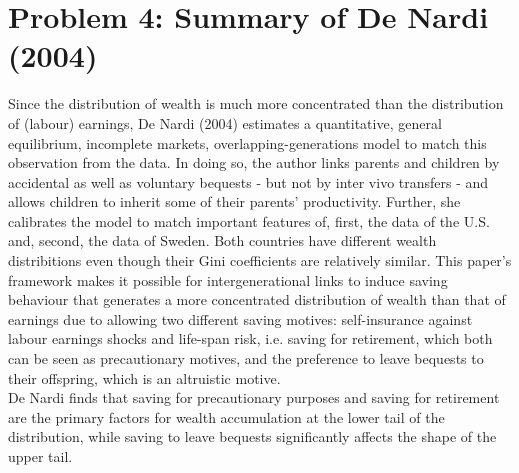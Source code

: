 \documentclass[12pt,a4paper]{article}
\begin{document}
\section*{Problem 4: Summary of De Nardi (2004)}
Since the distribution of wealth is much more concentrated than the distribution of (labour) earnings, De Nardi (2004) estimates a quantitative, general equilibrium, incomplete markets, overlapping-generations model to match this observation from the data. In doing so, the author links parents and children by accidental as well as voluntary bequests - but not by inter vivo transfers - and allows children to inherit some of their parents' productivity. Further, she calibrates the model to match important features of, first, the data of the U.S. and, second, the data of Sweden. Both countries have different wealth distribitions even though their Gini coefficients are relatively similar. This paper's framework makes it possible for intergenerational links to induce saving behaviour that generates a more concentrated distribution of wealth than that of earnings due to allowing two different saving motives: self-insurance against labour earnings shocks and life-span risk, i.e. saving for retirement, which both can be seen as precautionary motives, and the preference to leave bequests to their offspring, which is an altruistic motive. 
\\
De Nardi finds that saving for precautionary purposes and saving for retirement are the primary factors for wealth accumulation at the lower tail of the distribution, while saving to leave bequests significantly affects the shape of the upper tail.
\end{document}

